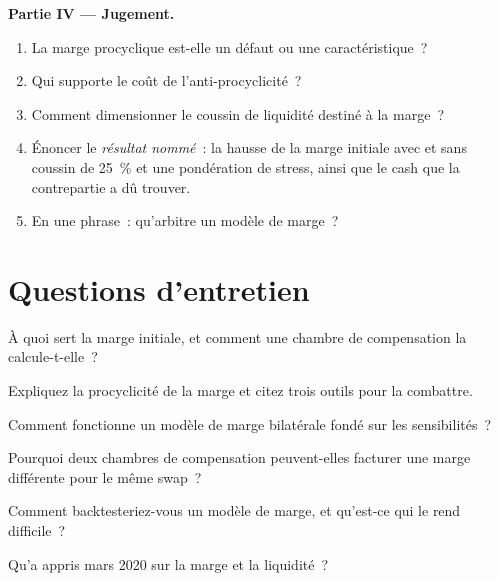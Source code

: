\begin{problem}
\medskip\noindent\textbf{Partie IV --- Jugement.}
\begin{enumerate}[resume]
\item La marge procyclique est-elle un défaut ou une caractéristique~?
\item Qui supporte le coût de l'anti-procyclicité~?
\item Comment dimensionner le coussin de liquidité destiné à la marge~?
\item Énoncer le \emph{résultat nommé}~: la hausse de la marge initiale avec et sans coussin de 25~\% et une pondération de stress,
ainsi que le cash que la contrepartie a dû trouver.
\item En une phrase~: qu'arbitre un modèle de marge~?
\end{enumerate}
\end{problem}

\section{Questions d'entretien}

\begin{interviewq}\label{iq:rc:margin-models:1}
À quoi sert la marge initiale, et comment une chambre de compensation la calcule-t-elle~?
\end{interviewq}

\begin{interviewq}\label{iq:rc:margin-models:2}
Expliquez la procyclicité de la marge et citez trois outils pour la combattre.
\end{interviewq}

\begin{interviewq}\label{iq:rc:margin-models:3}
Comment fonctionne un modèle de marge bilatérale fondé sur les sensibilités~?
\end{interviewq}

\begin{interviewq}\label{iq:rc:margin-models:4}
Pourquoi deux chambres de compensation peuvent-elles facturer une marge différente pour le même swap~?
\end{interviewq}

\begin{interviewq}\label{iq:rc:margin-models:5}
Comment backtesteriez-vous un modèle de marge, et qu'est-ce qui le rend difficile~?
\end{interviewq}

\begin{interviewq}\label{iq:rc:margin-models:6}
Qu'a appris mars 2020 sur la marge et la liquidité~?
\end{interviewq}
